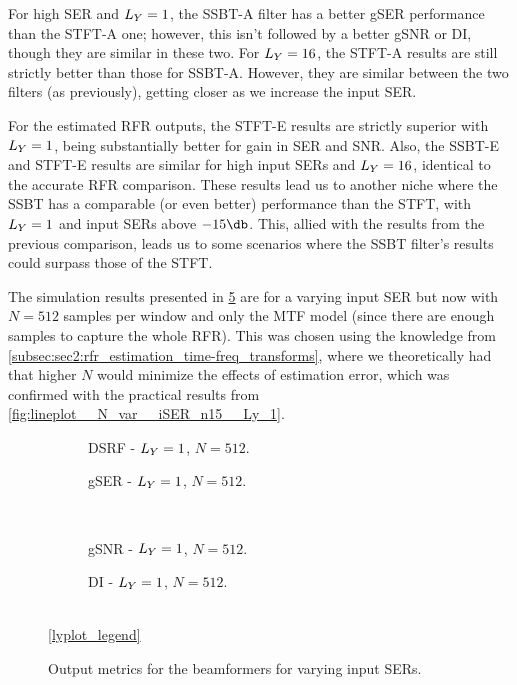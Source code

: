 For high SER and $\Ly = 1$, the SSBT-A filter has a better gSER performance than the STFT-A one; however, this isn't followed by a better gSNR or DI, though they are similar in these two. For $\Ly = 16$, the STFT-A results are still strictly better than those for SSBT-A. However, they are similar between the two filters (as previously), getting closer as we increase the input SER.

For the estimated RFR outputs, the STFT-E results are strictly superior with $\Ly = 1$, being substantially better for gain in SER and SNR. Also, the SSBT-E and STFT-E results are similar for high input SERs and $\Ly = 16$, identical to the accurate RFR comparison. These results lead us to another niche where the SSBT has a comparable (or even better) performance than the STFT, with $\Ly = 1$ and input SERs above $-15\dB$. This, allied with the results from the previous comparison, leads us to some scenarios where the SSBT filter's results could surpass those of the STFT.

The simulation results presented in \cref{fig:lineplot__N_512__iSER_var__Ly_1} are for a varying input SER but now with $N = 512$ samples per window and only the MTF model (since there are enough samples to capture the whole RFR). This was chosen using the knowledge from \cref{subsec:sec2:rfr_estimation_time-freq_transforms}, where we theoretically had that higher $N$ would minimize the effects of estimation error, which was confirmed with the practical results from \cref{fig:lineplot__N_var__iSER_n15__Ly_1}.

\begin{figure}[!ht]
	\centering
	\begin{subfigure}{0.49\textwidth}
		\centering
		
		\caption{DSRF - $\Ly = 1$, $N = 512$.}
		\label{subfig:lineplot__DSRF__N_512__iSER_var__Ly_1}
	\end{subfigure}\hfill
	\begin{subfigure}{0.49\textwidth}
		\centering
		
		\caption{gSER - $\Ly = 1$, $N = 512$.}
		\label{subfig:lineplot__gSER__N_512__iSER_var__Ly_1}
	\end{subfigure}\\[1em]
	\begin{subfigure}{0.49\textwidth}
		\centering
		
		\caption{gSNR - $\Ly = 1$, $N = 512$.}
		\label{subfig:lineplot__gSNR__N_512__iSER_var__Ly_1}
	\end{subfigure}\hfill
	\begin{subfigure}{0.49\textwidth}
		\centering
		
		\caption{DI - $\Ly = 1$, $N = 512$.}
		\label{subfig:lineplot__DI__N_512__iSER_var__Ly_1}
	\end{subfigure}\\[1em]
	\ref*{lyplot_legend}
	\caption{Output metrics for the beamformers for varying input SERs.}
	\label{fig:lineplot__N_512__iSER_var__Ly_1}
\end{figure}

